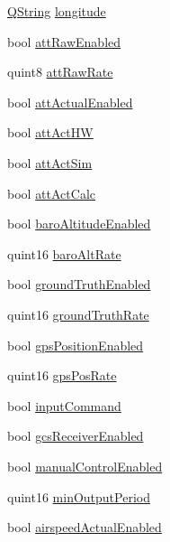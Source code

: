 \begin{DoxyCompactItemize}
\item 
\hyperlink{group___u_a_v_objects_plugin_gab9d252f49c333c94a72f97ce3105a32d}{\-Q\-String} \hyperlink{group___h_i_t_l_plugin_gac60d13c120d3dd97309688a1d7f3d6d7}{longitude}
\item 
bool \hyperlink{group___h_i_t_l_plugin_ga003958320fd5c963c5d2ddff60ffd28b}{att\-Raw\-Enabled}
\item 
quint8 \hyperlink{group___h_i_t_l_plugin_ga70d4f6a60b23f4545d46ff7dfe4c710e}{att\-Raw\-Rate}
\item 
bool \hyperlink{group___h_i_t_l_plugin_ga9b02793b3d0effcdb43df1d5e20012fd}{att\-Actual\-Enabled}
\item 
bool \hyperlink{group___h_i_t_l_plugin_ga4e0f8f54388f25df1142b8f895a4b445}{att\-Act\-H\-W}
\item 
bool \hyperlink{group___h_i_t_l_plugin_ga8620f5c9256ac5988861939a70fde264}{att\-Act\-Sim}
\item 
bool \hyperlink{group___h_i_t_l_plugin_gab40adc150ae79f115f2680cdf131b41d}{att\-Act\-Calc}
\item 
bool \hyperlink{group___h_i_t_l_plugin_ga6700d3be0f4ef9211d6f34569034b7a8}{baro\-Altitude\-Enabled}
\item 
quint16 \hyperlink{group___h_i_t_l_plugin_gab5b66abe21b9a0f00b2dc2bbb28cac6c}{baro\-Alt\-Rate}
\item 
bool \hyperlink{group___h_i_t_l_plugin_ga7da92539dd2e9e4aeb94b848dc464b11}{ground\-Truth\-Enabled}
\item 
quint16 \hyperlink{group___h_i_t_l_plugin_ga46aa73f7e222771afe3b547bca31eacb}{ground\-Truth\-Rate}
\item 
bool \hyperlink{group___h_i_t_l_plugin_gaec1f5b5cc3ce18186907fde4c9c990b3}{gps\-Position\-Enabled}
\item 
quint16 \hyperlink{group___h_i_t_l_plugin_ga2904afd635e416ec6fca4b3b6bb8679f}{gps\-Pos\-Rate}
\item 
bool \hyperlink{group___h_i_t_l_plugin_gaef59cc30b3dc3c996cfba35065d250bd}{input\-Command}
\item 
bool \hyperlink{group___h_i_t_l_plugin_ga2e4de2a270dafeeadda687a7fc6fb817}{gcs\-Receiver\-Enabled}
\item 
bool \hyperlink{group___h_i_t_l_plugin_gac67de1b6ac74a48c592f55fd17e06ad8}{manual\-Control\-Enabled}
\item 
quint16 \hyperlink{group___h_i_t_l_plugin_ga11d8608f07438f05d1950aa62f774d0c}{min\-Output\-Period}
\item 
bool \hyperlink{group___h_i_t_l_plugin_ga8fc341e96193fe41625a04a534a16387}{airspeed\-Actual\-Enabled}

\end{DoxyCompactItemize}
